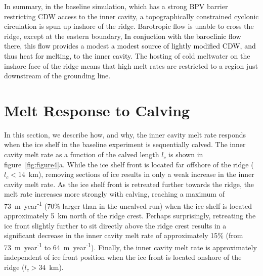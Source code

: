 \documentclass[draft]{agujournal2019}
\newcommand{\rout}[1]{\red{\st{#1}}}\newcommand{\ab}[1]{\textcolor{Green}{#1}}\newcommand{\about}[1]{\textcolor{Cyan}{\sout{#1}}}
\newcommand{\blue}[1]{\textcolor{blue}{#1}}
\newcommand{\red}[1]{\textcolor{red}{#1}}
\renewcommand{\rout}[1]{{}} %
\renewcommand{\blue}[1]{{\textcolor{black}{#1}}} %
\renewcommand{\red}[1]{{}} %
\begin{document}
In summary, in the baseline simulation, which has a strong BPV barrier restricting CDW access to the inner cavity, a topographically constrained cyclonic circulation is spun up inshore of the ridge. Barotropic flow is unable to cross the ridge, except at the eastern boundary, \rout{where}\blue{In conjuction with the baroclinic flow there, this flow provides} a modest \blue{a modest source of lightly modified CDW, and thus heat for melting, to the inner cavity.} \rout{This provides current  the inner cavity with lightly modified CDW and thus a source of heat for melting.} The hosting of cold meltwater on the inshore face of the ridge means that high melt rates are restricted to a region just downstream of the grounding line.

\section{Melt Response to Calving}\label{S:Results:lc}
In this section, we describe how, and why, the inner cavity melt rate responds when the ice shelf in the baseline experiment is sequentially calved. The inner cavity melt rate as a function of the calved length $l_c$ is shown in figure~\ref{fig:figure4}a. While the ice shelf front is located far offshore of the ridge ($l_c< 14$~km), removing sections of ice results in only a weak increase in the inner cavity melt rate. As the ice shelf front is retreated further towards the ridge, the melt rate increases more strongly with calving, reaching a maximum of 73~m~year\textsuperscript{-1} (70\% larger than in the uncalved run) when the ice shelf is located approximately 5~km north of the ridge crest. Perhaps surprisingly, retreating the ice front slightly further to sit directly above the ridge crest results in a significant decrease in the inner cavity melt rate of approximately 15\% (from 73~m~year\textsuperscript{-1} to 64~m~year\textsuperscript{-1}). Finally, the inner cavity melt rate is approximately independent of ice front position when the ice front is located onshore of the ridge ($l_c>34$~km).
\end{document}

